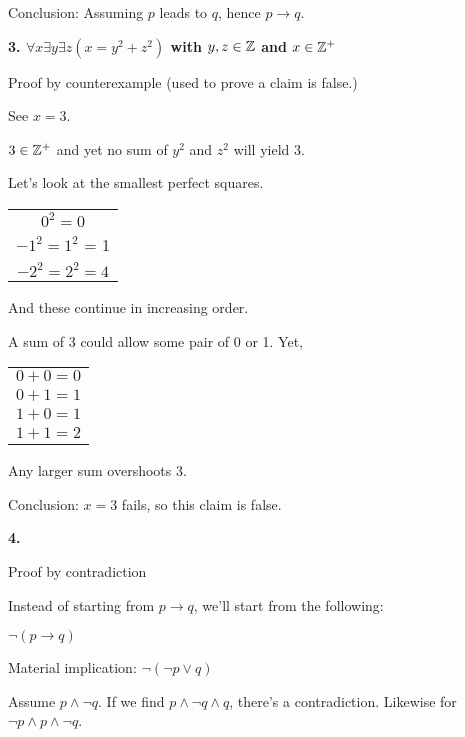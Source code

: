 \documentclass{exam}
\begin{document}
	Conclusion: Assuming $p$ leads to $q$, hence $p \rightarrow q$.\newline
	
	\textbf{3. $\forall x \exists y \exists z (x=y^2 + z^2)$ with $y,z \in \Bbb Z$ and $x \in \Bbb Z^+$}
	
	Proof by counterexample (used to prove a claim is false.)
	
	See $x=3$.
	
	$3 \in \Bbb Z^+$ and yet no sum of $y^2$ and $z^2$ will yield $3$.
	
	Let's look at the smallest perfect squares.
	
	\begin{tabular}{c}
		$0^2 = 0$\\
		$-1^2 = 1^2$ = 1\\
		$-2^2 = 2^2 = 4$\\
	\end{tabular}
	
	And these continue in increasing order.
	
	A sum of 3 could allow some pair of 0 or 1. Yet,
	
	\begin{tabular}{c}
		$0+0=0$\\
		$0+1=1$\\
		$1+0=1$\\
		$1+1=2$\\
	\end{tabular}
	
	Any larger sum overshoots 3.
	
	Conclusion: $x=3$ fails, so this claim is false.\newline
	
	
	\textbf{4. }
	
	Proof by contradiction
	
	Instead of starting from $p \rightarrow q$, we'll start from the following:
	
	$\neg (p \rightarrow q)$
	
	Material implication: $\neg(\neg p \lor q)$
	
	Assume $p \wedge \neg q$. If we find $p \wedge \neg q \wedge q$, there's a contradiction. Likewise for $\neg p \wedge p \wedge \neg q$.
	
\end{document}
